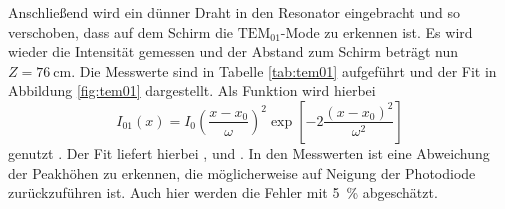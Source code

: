 Anschließend wird ein dünner Draht in den Resonator eingebracht und so verschoben, dass auf dem Schirm die $\text{TEM}_{01}$-Mode zu erkennen ist.
Es wird wieder die Intensität gemessen und der Abstand zum Schirm beträgt nun $Z = \SI{76}{\centi\meter}$.
Die Messwerte sind in Tabelle \ref{tab:tem01} aufgeführt und der Fit in Abbildung \ref{fig:tem01} dargestellt.
Als Funktion wird hierbei
\begin{equation}
    \label{eqn:tem01}
    I_{01}(x) = I_0 \left(\frac{x-x_0}{\omega}\right)^2 \exp \left[-2 \frac{\left(x-x_0\right)^2}{\omega^2}\right]
\end{equation}
genutzt \cite{Wiki_TEM}.
Der Fit liefert hierbei ,  und .
In den Messwerten ist eine Abweichung der Peakhöhen zu erkennen, die möglicherweise auf Neigung der Photodiode zurückzuführen ist.
Auch hier werden die Fehler mit \SI{5}{\percent} abgeschätzt.
